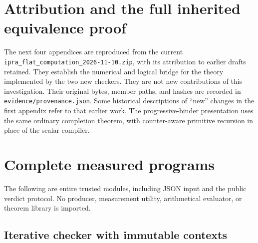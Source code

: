 \documentclass[11pt,letterpaper]{article}
\theoremstyle{definition}\newtheorem{definition}[theorem]{Definition}
\theoremstyle{remark}\newtheorem{remark}[theorem]{Remark}
\newcommand{\file}[1]{{\small\nolinkurl{#1}}}
\begin{document}
\section*{Attribution and the full inherited equivalence proof}
The next four appendices are reproduced from the current
\file{ipra_flat_computation_2026-11-10.zip}, with its attribution
to earlier drafts retained. They establish the numerical and logical
bridge for the theory implemented by the two new checkers. They are
not new contributions of this investigation. Their original bytes,
member paths, and hashes are recorded in
\file{evidence/provenance.json}. Some historical descriptions of
``new'' changes in the first appendix refer to that earlier work.
The progressive-binder presentation uses the same ordinary completion
theorem, with counter-aware primitive recursion in place of the scalar
compiler.




\clearpage
\section{Complete measured programs}
The following are entire trusted modules, including JSON input and
the public verdict protocol. No producer, measurement utility,
arithmetical evaluator, or theorem library is imported.
\subsection{Iterative checker with immutable contexts}

\clearpage
\end{document}
